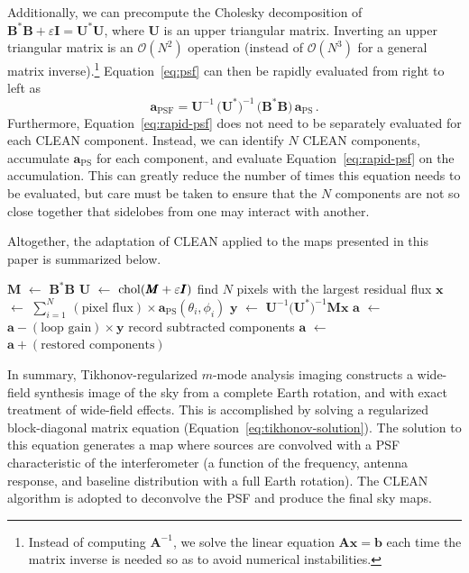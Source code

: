 \documentclass[twocolumn]{aastex61}
\newcommand*\Let[2]{\State #1 $\gets$ #2}
\renewcommand{\b}{\pmb}
\begin{document}
Additionally, we can precompute the Cholesky decomposition of $\b B^*\b B + \varepsilon\b I = \b
U^*\b U$, where $\b U$ is an upper triangular matrix. Inverting an upper triangular matrix is an
$\mathcal{O}(N^2)$ operation (instead of $\mathcal{O}(N^3)$ for a general matrix inverse).\footnote{
    Instead of computing $\b A^{-1}$, we solve the linear equation $\b A\b x = \b b$ each time the
    matrix inverse is needed so as to avoid numerical instabilities.
}
Equation~\ref{eq:psf} can then be rapidly evaluated from right to left as
\begin{equation}\label{eq:rapid-psf}
    \b a_\text{PSF} =
        \b U^{-1}\,\big(\b U^*\big)^{-1}\,\big(\b B^*\b B\big)\,\b a_\text{PS}\,.
\end{equation}
Furthermore, Equation~\ref{eq:rapid-psf} does not need to be separately evaluated for each CLEAN
component. Instead, we can identify $N$ CLEAN components, accumulate $\b a_\text{PS}$ for each
component, and evaluate Equation~\ref{eq:rapid-psf} on the accumulation. This can greatly reduce the
number of times this equation needs to be evaluated, but care must be taken to ensure that the $N$
components are not so close together that sidelobes from one may interact with another.

Altogether, the adaptation of CLEAN applied to the maps presented in this paper is summarized below.
\begin{algorithmic}[1]
    \Require{$\b a$ is the solution to Equation~\ref{eq:tikhonov-solution}}
    \Function{CLEAN}{$\b a$}
    \Let{$\b M$}{$\b B^*\b B$}
    \Let{$\b U$}{${\rm chol}(\b M + \varepsilon\b I)$} 
    \State find $N$ pixels with the largest residual flux
    \Let{$\b x$}{$\sum_{i=1}^N \,(\text{pixel flux}) \times \b a_\text{PS}(\theta_i, \phi_i)$}
    \Let{$\b y$}{$\b U^{-1}\big(\b U^*\big)^{-1}\b M\b x$}
    \Let{$\b a$}{$\b a - (\text{loop gain})\times\b y$}
    \State record subtracted components
    \EndWhile
    \Let{$\b a$}{$\b a + (\text{restored components})$}
    \State \Return{$\b a$}
    \EndFunction
\end{algorithmic}

In summary, Tikhonov-regularized $m$-mode analysis imaging constructs a wide-field synthesis image of
the sky from a complete Earth rotation, and  with exact treatment of wide-field effects. This is
accomplished by solving a regularized block-diagonal matrix equation
(Equation~\ref{eq:tikhonov-solution}). The solution to this equation generates a map where
sources are convolved with a PSF characteristic of the interferometer (a function of the frequency,
antenna response, and baseline distribution with a full Earth rotation). The CLEAN algorithm is
adopted to deconvolve the PSF and produce the final sky maps.
\end{document}
